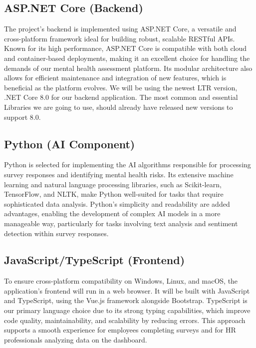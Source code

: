 \documentclass[conference]{IEEEtran}
\begin{document}
\subsection {ASP.NET Core (Backend)}

    The project’s backend is implemented using ASP.NET Core, 
    a versatile and cross-platform framework ideal for building 
    robust, scalable RESTful APIs. Known for its high performance, 
    ASP.NET Core is compatible with both cloud and container-based 
    deployments, making it an excellent choice for handling the 
    demands of our mental health assessment platform. Its modular 
    architecture also allows for efficient maintenance and 
    integration of new features, which is beneficial as the 
    platform evolves. We will be using the newest LTR version, 
    .NET Core 8.0 for our backend application. The most common and 
    essential Libraries we are going to use, should already have 
    released new versions to support 8.0.
    \newline

\subsection {Python (AI Component)}

    Python is selected for implementing the AI algorithms 
    responsible for processing survey responses and 
    identifying mental health risks. Its extensive machine 
    learning and natural language processing libraries, 
    such as Scikit-learn, TensorFlow, and NLTK, make Python 
    well-suited for tasks that require sophisticated data 
    analysis. Python’s simplicity and readability are added 
    advantages, enabling the development of complex AI 
    models in a more manageable way, particularly for tasks 
    involving text analysis and sentiment detection within 
    survey responses.
    \newline


\subsection {JavaScript/TypeScript (Frontend)}

    To ensure cross-platform compatibility on Windows, Linux, 
    and macOS, the application's frontend will run in a web 
    browser. It will be built with JavaScript and TypeScript, 
    using the Vue.js framework alongside Bootstrap. TypeScript 
    is our primary language choice due to its strong typing 
    capabilities, which improve code quality, maintainability, 
    and scalability by reducing errors. This approach supports 
    a smooth experience for employees completing surveys and 
    for HR professionals analyzing data on the dashboard.
    \newline
\end{document}
